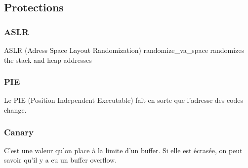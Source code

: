 \subsection{Protections}
\subsubsection{ASLR}
ASLR (Adress Space Layout Randomization) randomize\_va\_space randomizes the stack and heap addresses
\subsubsection{PIE}
Le PIE (Position Independent Executable) fait en sorte que l'adresse des codes change.
\subsubsection{Canary}
C'est une valeur qu'on place à la limite d'un buffer. Si elle est écrasée, on peut savoir qu'il y a eu un buffer overflow.
